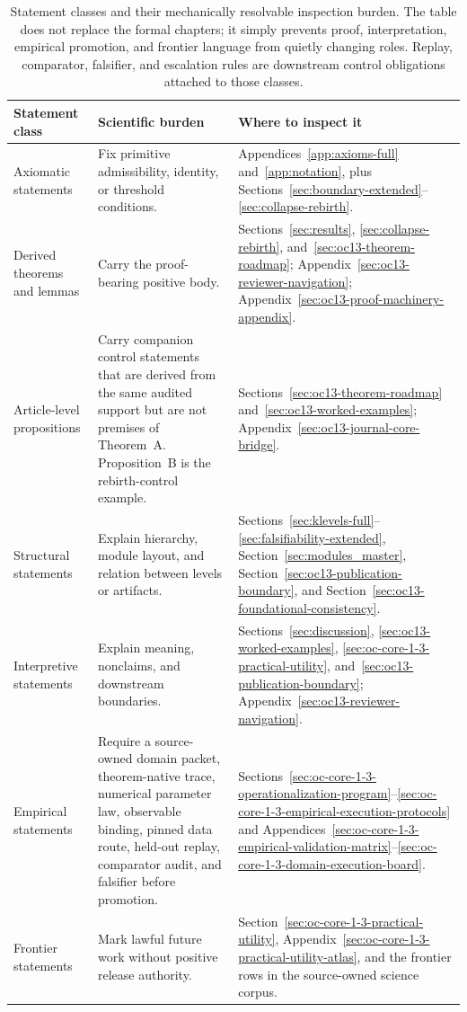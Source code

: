 \begin{table}[htbp]
\centering
\begingroup
\footnotesize
\RaggedRight
\setlength{\tabcolsep}{4pt}
\begin{tabular}{@{}L{0.21\textwidth}L{0.28\textwidth}L{0.39\textwidth}@{}}
\toprule
\textbf{Statement class} & \textbf{Scientific burden} & \textbf{Where to inspect it} \\
\midrule
Axiomatic statements & Fix primitive admissibility, identity, or threshold conditions. & Appendices~\ref{app:axioms-full} and~\ref{app:notation}, plus Sections~\ref{sec:boundary-extended}--\ref{sec:collapse-rebirth}. \\
Derived theorems and lemmas & Carry the proof-bearing positive body. & Sections~\ref{sec:results}, \ref{sec:collapse-rebirth}, and~\ref{sec:oc13-theorem-roadmap}; Appendix~\ref{sec:oc13-reviewer-navigation}; Appendix~\ref{sec:oc13-proof-machinery-appendix}. \\
Article-level propositions & Carry companion control statements that are derived from the same audited support but are not premises of Theorem~A. Proposition~B is the rebirth-control example. & Sections~\ref{sec:oc13-theorem-roadmap} and~\ref{sec:oc13-worked-examples}; Appendix~\ref{sec:oc13-journal-core-bridge}. \\
Structural statements & Explain hierarchy, module layout, and relation between levels or artifacts. & Sections~\ref{sec:klevels-full}--\ref{sec:falsifiability-extended}, Section~\ref{sec:modules_master}, Section~\ref{sec:oc13-publication-boundary}, and Section~\ref{sec:oc13-foundational-consistency}. \\
Interpretive statements & Explain meaning, nonclaims, and downstream boundaries. & Sections~\ref{sec:discussion}, \ref{sec:oc13-worked-examples}, \ref{sec:oc-core-1-3-practical-utility}, and~\ref{sec:oc13-publication-boundary}; Appendix~\ref{sec:oc13-reviewer-navigation}. \\
Empirical statements & Require a source-owned domain packet, theorem-native trace, numerical parameter law, observable binding, pinned data route, held-out replay, comparator audit, and falsifier before promotion. & Sections~\ref{sec:oc-core-1-3-operationalization-program}--\ref{sec:oc-core-1-3-empirical-execution-protocols} and Appendices~\ref{sec:oc-core-1-3-empirical-validation-matrix}--\ref{sec:oc-core-1-3-domain-execution-board}. \\
Frontier statements & Mark lawful future work without positive release authority. & Section~\ref{sec:oc-core-1-3-practical-utility}, Appendix~\ref{sec:oc-core-1-3-practical-utility-atlas}, and the frontier rows in the source-owned science corpus. \\
\bottomrule
\end{tabular}
\endgroup
\caption{Statement classes and their mechanically resolvable inspection burden. The table
does not replace the formal chapters; it simply prevents proof, interpretation,
empirical promotion, and frontier language from quietly changing roles. Replay,
comparator, falsifier, and escalation rules are downstream control obligations
attached to those classes.}
\label{tab:oc13-statement-classes}
\end{table}

